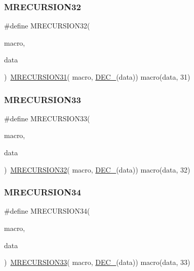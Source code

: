 \subsubsection{\texorpdfstring{MRECURSION32}{MRECURSION32}}
{\footnotesize\ttfamily \#define M\+R\+E\+C\+U\+R\+S\+I\+O\+N32(\begin{DoxyParamCaption}\item[{}]{macro,  }\item[{}]{data }\end{DoxyParamCaption})~\mbox{\hyperlink{group__group__sam0__utils__mrecursion_ga75814302d0a93ce9b7ee446c5e734d71}{M\+R\+E\+C\+U\+R\+S\+I\+O\+N31}}(  macro, \mbox{\hyperlink{group__group__sam0__utils__mrecursion_ga1d23d683797679dca8c3512a54a5dcae}{D\+E\+C\+\_\+}}(data))   macro(data, 31)}

\mbox{\label{group__group__sam0__utils__mrecursion_ga69b9fe1f38b856bfbce8006cecfb7ab6}} 
\subsubsection{\texorpdfstring{MRECURSION33}{MRECURSION33}}
{\footnotesize\ttfamily \#define M\+R\+E\+C\+U\+R\+S\+I\+O\+N33(\begin{DoxyParamCaption}\item[{}]{macro,  }\item[{}]{data }\end{DoxyParamCaption})~\mbox{\hyperlink{group__group__sam0__utils__mrecursion_gac43f3446adca956aebe694bac78623eb}{M\+R\+E\+C\+U\+R\+S\+I\+O\+N32}}(  macro, \mbox{\hyperlink{group__group__sam0__utils__mrecursion_ga1d23d683797679dca8c3512a54a5dcae}{D\+E\+C\+\_\+}}(data))   macro(data, 32)}

\mbox{\label{group__group__sam0__utils__mrecursion_ga36973b26fc7f9e90f40c6667a2f2c85c}} 
\subsubsection{\texorpdfstring{MRECURSION34}{MRECURSION34}}
{\footnotesize\ttfamily \#define M\+R\+E\+C\+U\+R\+S\+I\+O\+N34(\begin{DoxyParamCaption}\item[{}]{macro,  }\item[{}]{data }\end{DoxyParamCaption})~\mbox{\hyperlink{group__group__sam0__utils__mrecursion_ga69b9fe1f38b856bfbce8006cecfb7ab6}{M\+R\+E\+C\+U\+R\+S\+I\+O\+N33}}(  macro, \mbox{\hyperlink{group__group__sam0__utils__mrecursion_ga1d23d683797679dca8c3512a54a5dcae}{D\+E\+C\+\_\+}}(data))   macro(data, 33)}

